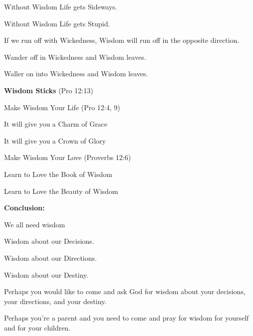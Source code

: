 \begin{compactenum}[I.][4]
\begin{compactenum}[A.]
        \begin{compactenum}[1.]
            \item Without Wisdom Life gets Sideways.
            \item Without Wisdom Life gets Stupid.
        \end{compactenum}
        \item If we run off with Wickedness, Wisdom will run off in the opposite direction.
        \begin{compactenum}[1.]
            \item Wander off in Wickedness and Wisdom leaves.
            \item Waller on into Wickedness and Wisdom leaves.
        \end{compactenum}
    \end{compactenum}
    \item \textbf{Wisdom Sticks} (Pro 12:13)
    \begin{compactenum}[A.]
        \item Make Wisdom Your Life  (Pro 12:4, 9)
        \begin{compactenum}[1.]
            \item It will give you a Charm of Grace
            \item It will give you a Crown of Glory
        \end{compactenum}
        \item Make Wisdom Your Love (Proverbs 12:6)
        \begin{compactenum}[1.]
            \item Learn to Love the Book of Wisdom\!
            \item Learn to Love the Beauty of Wisdom\!
        \end{compactenum}
    \end{compactenum}
\end{compactenum}
\textbf{Conclusion: }
\begin{compactenum}[1.]
    \item We all need wisdom\!
    \begin{compactenum}[a.]
        \item Wisdom about our Decisions.
        \item Wisdom about our Directions.
        \item Wisdom about our Destiny.
    \end{compactenum}
    \item Perhaps you would like to come and ask God for wisdom about your decisions, your directions, and your destiny.
    \item Perhaps you’re a parent and you need to come and pray for wisdom for yourself and for your children.
\end{compactenum}


